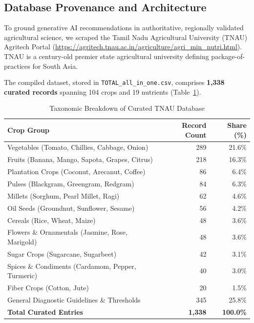 \documentclass[9pt,twocolumn,a4paper,landscape]{article}
\begin{document}
\subsection{Database Provenance and Architecture}
To ground generative AI recommendations in authoritative, regionally validated agricultural science, we scraped the Tamil Nadu Agricultural University (TNAU) Agritech Portal (\url{https://agritech.tnau.ac.in/agriculture/agri_min_nutri.html}). TNAU is a century-old premier state agricultural university defining package-of-practices for South Asia.

The compiled dataset, stored in \texttt{TOTAL\_all\_in\_one.csv}, comprises \textbf{1,338 curated records} spanning 104 crops and 19 nutrients (Table~\ref{tab:tnau_stats}).

\begin{table}[htbp]
\centering
\caption{Taxonomic Breakdown of Curated TNAU Database}
\label{tab:tnau_stats}
\scriptsize
\begin{tabular}{lrr}
\toprule
\textbf{Crop Group} & \textbf{Record Count} & \textbf{Share (\%)} \\
\midrule
Vegetables (Tomato, Chillies, Cabbage, Onion) & 289 & 21.6\% \\
Fruits (Banana, Mango, Sapota, Grapes, Citrus) & 218 & 16.3\% \\
Plantation Crops (Coconut, Arecanut, Coffee) & 86 & 6.4\% \\
Pulses (Blackgram, Greengram, Redgram) & 84 & 6.3\% \\
Millets (Sorghum, Pearl Millet, Ragi) & 62 & 4.6\% \\
Oil Seeds (Groundnut, Sunflower, Sesame) & 56 & 4.2\% \\
Cereals (Rice, Wheat, Maize) & 48 & 3.6\% \\
Flowers \& Ornamentals (Jasmine, Rose, Marigold) & 48 & 3.6\% \\
Sugar Crops (Sugarcane, Sugarbeet) & 42 & 3.1\% \\
Spices \& Condiments (Cardamom, Pepper, Turmeric) & 40 & 3.0\% \\
Fiber Crops (Cotton, Jute) & 20 & 1.5\% \\
General Diagnostic Guidelines \& Thresholds & 345 & 25.8\% \\
\midrule
\textbf{Total Curated Entries} & \textbf{1,338} & \textbf{100.0\%} \\
\bottomrule
\end{tabular}
\end{table}
\end{document}

